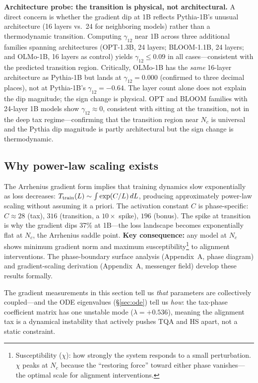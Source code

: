 \documentclass[11pt]{article}
\begin{document}
\textbf{Architecture probe: the transition is physical, not architectural.}
A direct concern is whether the gradient dip at 1B reflects Pythia-1B's unusual architecture (16 layers vs.\ 24 for neighboring models) rather than a thermodynamic transition.
Computing $\gamma_{12}$ near 1B across three additional families spanning architectures (OPT-1.3B, 24 layers; BLOOM-1.1B, 24 layers; and OLMo-1B, 16 layers as control) yields $\gamma_{12} \leq 0.09$ in all cases---consistent with the predicted transition region.
Critically, OLMo-1B has the \emph{same} 16-layer architecture as Pythia-1B but lands at $\gamma_{12}=0.000$ (confirmed to three decimal places), not at Pythia-1B's $\gamma_{12}=-0.64$.
The layer count alone does not explain the dip magnitude; the sign change is physical.
OPT and BLOOM families with 24-layer 1B models show $\gamma_{12} \approx 0$, consistent with sitting at the transition, not in the deep tax regime---confirming that the transition region near $N_c$ is universal and the Pythia dip magnitude is partly architectural but the sign change is thermodynamic.

\subsection{Why power-law scaling exists}

The Arrhenius gradient form implies that training dynamics slow exponentially as loss decreases: $T_{\rm train}(L) \sim \int \exp(C/L)\,dL$, producing approximately power-law scaling without assuming it a priori.
The activation constant $C$ is phase-specific: $C \approx 28$ (tax), $316$ (transition, a $10\times$ spike), $196$ (bonus).
The spike at transition is why the gradient dips 37\% at 1B---the loss landscape becomes exponentially flat at $N_c$, the Arrhenius saddle point.
\textbf{Key consequence:} any model at $N_c$ shows minimum gradient norm and maximum susceptibility\footnote{Susceptibility ($\chi$): how strongly the system responds to a small perturbation. $\chi$ peaks at $N_c$ because the ``restoring force'' toward either phase vanishes---the optimal scale for alignment interventions.} to alignment interventions.
The phase-boundary surface analysis (Appendix~A, phase diagram) and gradient-scaling derivation (Appendix~A, messenger field) develop these results formally.

The gradient measurements in this section tell us \emph{that} parameters are collectively coupled---and the ODE eigenvalues (\S\ref{sec:ode}) tell us \emph{how}: the tax-phase coefficient matrix has one unstable mode ($\lambda = +0.536$), meaning the alignment tax is a dynamical instability that actively pushes TQA and HS apart, not a static constraint.
\end{document}
